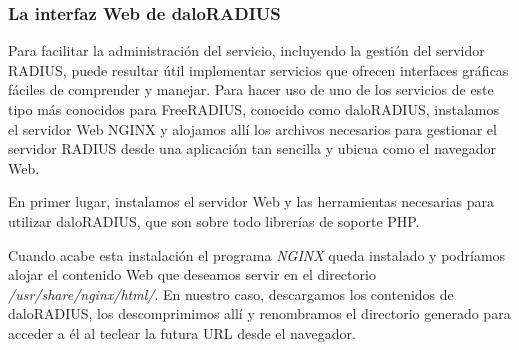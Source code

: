 \subsubsection{La interfaz Web de daloRADIUS} \label{daloRADIUSInstall}

Para facilitar la administración del servicio, incluyendo la gestión del servidor RADIUS, puede resultar útil implementar servicios que ofrecen interfaces gráficas fáciles de comprender y manejar. Para hacer uso de uno de los servicios de este tipo más conocidos para FreeRADIUS, conocido como daloRADIUS, instalamos el servidor Web NGINX y alojamos allí los archivos necesarios para gestionar el servidor RADIUS desde una aplicación tan sencilla y ubicua como el navegador Web.

En primer lugar, instalamos el servidor Web y las herramientas necesarias para utilizar daloRADIUS, que son sobre todo librerías de soporte PHP.


Cuando acabe esta instalación el programa \emph{NGINX} queda instalado y podríamos alojar el contenido Web que deseamos servir en el directorio \emph{/usr/share/nginx/html/}. En nuestro caso, descargamos los contenidos de daloRADIUS, los descomprimimos allí y renombramos el directorio generado para acceder a él al teclear la futura URL desde el navegador.


